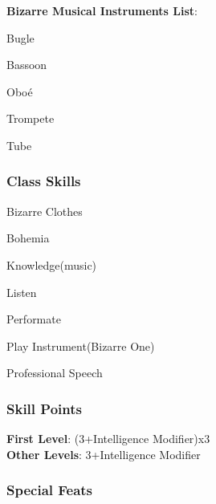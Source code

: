 \documentclass[ letterpaper,12pt]{article}
\begin{document}
{\bf Bizarre Musical Instruments List}:\\
\begin{itemize}
{\it 
\item{Bugle}
\item{Bassoon}
\item{Oboé}
\item{Trompete}
\item{Tube}
}
\end{itemize}

\subsubsection{Class Skills}
\begin{itemize}
{\it 
\item{Bizarre Clothes}
\item{Bohemia}
\item{Knowledge(music)}
\item{Listen}
\item{Performate}
\item{Play Instrument(Bizarre One)}
\item{Professional Speech}
}
\end{itemize}

\subsubsection{Skill Points}
{\bf First Level}: (3+Intelligence Modifier)x3\\
{\bf Other Levels}: 3+Intelligence Modifier\\

\subsubsection{Special Feats}
\end{document}

